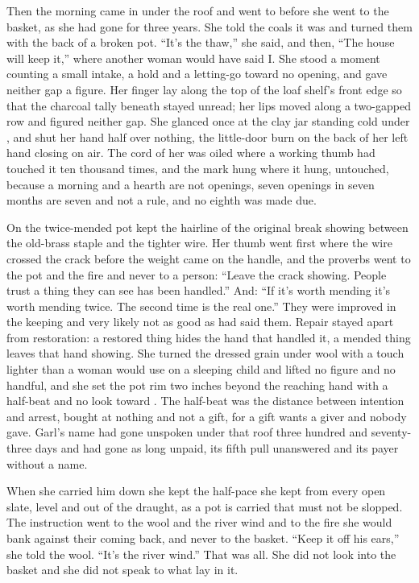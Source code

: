 Then the morning came in under the roof and  went to  before she went to the basket, as she had gone for three years. She told the coals it was  and turned them with the back of a broken pot. “It's the thaw,” she said, and then, “The house will keep it,” where another woman would have said I. She stood a moment counting a small intake, a hold and a letting-go toward no opening, and gave neither gap a figure. Her finger lay along the top of the loaf shelf's front edge so that the charcoal tally beneath stayed unread; her lips moved along a two-gapped row and figured neither gap. She glanced once at the clay jar standing cold under , and shut her hand half over nothing, the little-door burn on the back of her left hand closing on air. The cord of her  was oiled where a working thumb had touched it ten thousand times, and the mark hung where it hung, untouched, because a morning and a hearth are not openings, seven openings in seven months are seven and not a rule, and no eighth was made due.

On  the twice-mended pot kept the hairline of the original break showing between the old-brass staple and the tighter wire. Her thumb went first where the wire crossed the crack before the weight came on the handle, and the proverbs went to the pot and the fire and never to a person: “Leave the crack showing. People trust a thing they can see has been handled.” And: “If it's worth mending it's worth mending twice. The second time is the real one.” They were improved in the keeping and very likely not as good as  had said them. Repair stayed apart from restoration: a restored thing hides the hand that handled it, a mended thing leaves that hand showing. She turned the dressed grain under wool with a touch lighter than a woman would use on a sleeping child and lifted no figure and no handful, and she set the pot rim two inches beyond the reaching hand with a half-beat and no look toward . The half-beat was the distance between intention and arrest, bought at nothing and not a gift, for a gift wants a giver and nobody gave. Garl's name had gone unspoken under that roof three hundred and seventy-three days and  had gone as long unpaid, its fifth pull unanswered and its payer without a name.

When she carried him down she kept the half-pace she kept from every open slate, level and out of the draught, as a pot is carried that must not be slopped. The instruction went to the wool and the river wind and to the fire she would bank against their coming back, and never to the basket. “Keep it off his ears,” she told the wool. “It's the river wind.” That was all. She did not look into the basket and she did not speak to what lay in it.

